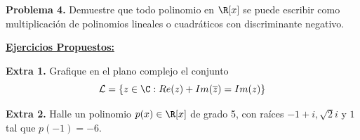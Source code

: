 \documentclass{article}
\begin{document}
\vspace{5mm}
\noindent\textbf{Problema 4.} Demuestre que todo polinomio en $\R[x]$ se puede escribir como 
multiplicación de polinomios lineales o cuadráticos con discriminante negativo.

\vspace{1cm}
\noindent\textbf{\underline{Ejercicios Propuestos:}}

\vspace{5mm}
\noindent\textbf{Extra 1.} Grafique en el plano complejo el conjunto
\begin{equation*}
    \mathcal{L}=\{z\in\C:Re(z)+Im(\overline{z})=Im(z)\}
\end{equation*}

\vspace{5mm}
\noindent\textbf{Extra 2.} Halle un polinomio $p(x)\in\R[x]$ de grado 5, con raíces $-1+i,
\sqrt{2}i$ y $1$ tal que $p(-1)=-6$.

\end{document}

